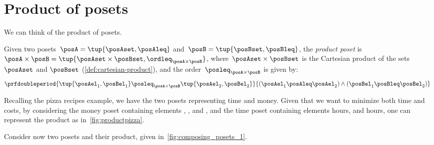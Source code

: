 
\section{Product of posets}
We can think of the product of posets.

\begin{definition}
    \label{def:productposet}
    Given two posets~$\posA=\tup{\posAset, \posAleq}$
    and~$\posB=\tup{\posBset, \posBleq}$, the \emph{product poset} is~$\posA\times \posB=\tup{\posAset \times \posBset, \ordleq_{\posA\times \posB}}$, where~$\posAset \times \posBset$ is the Cartesian product of the sets~$\posAset$ and $\posBset$ (\cref{def:cartesian-product}), and the order~$\posleq_{\posA \times \posB}$ is given by:
    \begin{equation}
        \prfdoubleperiod{\tup{\posAel_1, \posBel_1}
            \posleq_{\posA\times \posB}
            \tup{\posAel_2, \posBel_2}}{(\posAel_1 \posAleq \posAel_2) \wedge
            (\posBel_1 \posBleq \posBel_2)}
    \end{equation}
\end{definition}
Recalling the pizza recipes example, we have the two posets representing time and money.
Given that we want to minimize both time and costs, by considering the money poset containing elements \unit[10]{\CHF}, \unit[20]{\CHF}, and \unit[30]{\CHF}, and the time poset containing elements \unit[1]{hours}, and \unit[2]{hours}, one can represent the product as in~\cref{fig:productpizza}.

\begin{figure*}[h!]
    \centering
    \caption{Product poset of time and cost for pizza recipes.}
    \label{fig:productpizza}
\end{figure*}

\begin{example}
    Consider now two posets and their product, given in~\cref{fig:composing_posets_1}.
    \begin{figure*}[h!]
        \centering
        \caption{Product of two posets.}
        \label{fig:composing_posets_1}
    \end{figure*}
\end{example}
